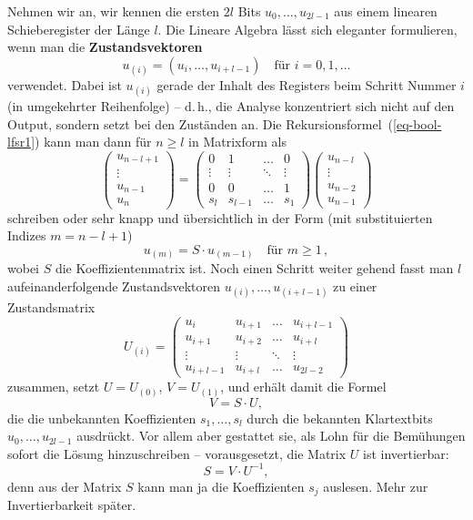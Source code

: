 \begin{refsegment}
Nehmen wir an, wir kennen die ersten $2l$ Bits $u_0, \ldots, u_{2l-1}$
aus einem linearen Schieberegister
der Länge $l$. Die Lineare Algebra lässt
sich eleganter formulieren, wenn man die {\bf Zustandsvektoren}
\[
     u_{(i)} = (u_i, \ldots, u_{i+l-1}) \quad \text{für } i = 0, 1, \ldots
\]
verwendet. Dabei ist $u_{(i)}$ gerade der Inhalt des Registers beim Schritt
Nummer $i$ (in umgekehrter Reihenfolge) -- d.\,h., die Analyse konzentriert
sich nicht auf den Output, sondern setzt bei den Zuständen an. Die
Rekursionsformel~(\ref{eq-bool-lfsr1}) kann man dann für $n \geq l$ in
Matrixform als
\[
     \begin{pmatrix} u_{n-l+1} \\ \vdots \\ u_{n-1} \\ u_{n} \end{pmatrix}
     =
     \begin{pmatrix} 0      & 1      & \ldots & 0      \\
                     \vdots & \vdots & \ddots & \vdots \\
                     0      & 0      & \ldots & 1      \\
                     s_l    & s_{l-1}    & \ldots & s_1 \end{pmatrix}
     \begin{pmatrix} u_{n-l} \\ \vdots \\ u_{n-2} \\ u_{n-1} \end{pmatrix}
\]
schreiben oder sehr knapp und übersichtlich in der Form (mit substituierten Indizes
$m = n-l+1$)
\[
     u_{(m)} = S \cdot u_{(m-1)} \quad \text{für } m \geq 1\,,
\]
wobei $S$ die Koeffizientenmatrix ist. Noch einen Schritt weiter gehend
fasst man $l$ aufeinanderfolgende Zustandsvektoren
$u_{(i)}, \ldots, u_{(i+l-1)}$ zu einer Zustandsmatrix
\[
     U_{(i)} = \begin{pmatrix} u_i      & u_{i+1}      & \ldots & u_{i+l-1}      \\
                               u_{i+1} & u_{i+2} & \ldots & u_{i+l} \\
                               \vdots  & \vdots & \ddots & \vdots     \\
                     u_{i+l-1}    & u_{i+l} & \ldots & u_{2l-2} \end{pmatrix}
\]
zusammen, setzt $U = U_{(0)}$, $V = U_{(1)}$, und erhält damit die Formel
\[
     V  =  S \cdot U,
\]
die die unbekannten Koeffizienten $s_1, \ldots, s_l$ durch die bekannten
Klartextbits $u_0, \ldots, u_{2l-1}$ ausdrückt. Vor allem aber gestattet sie,
als Lohn für die Bemühungen sofort die Lösung hinzuschreiben -- vorausgesetzt,
die Matrix $U$ ist invertierbar:
\[
     S  =  V \cdot U^{-1},
\]
denn aus der Matrix $S$ kann man ja die Koeffizienten $s_j$ auslesen.
Mehr zur Invertierbarkeit später.


\end{refsegment}
